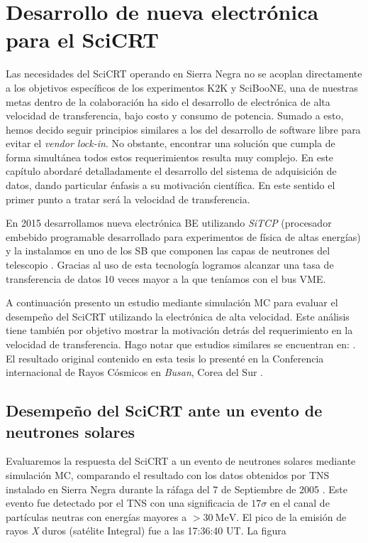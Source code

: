 
\chapter{Desarrollo de nueva electrónica para el SciCRT}
\label{chap:tres}

Las necesidades del SciCRT operando en Sierra Negra no se acoplan directamente a los objetivos específicos de los experimentos K2K y SciBooNE, una de nuestras metas dentro de la colaboración ha sido el desarrollo de electrónica de alta velocidad de transferencia, bajo costo y consumo de potencia. Sumado a esto, hemos decido seguir principios similares a los del desarrollo de software libre para evitar el \emph{vendor lock-in}. No obstante, encontrar una solución que cumpla de forma simultánea todos estos requerimientos resulta muy complejo. En este capítulo abordaré detalladamente el desarrollo del sistema de adquisición de datos, dando particular énfasis a su motivación científica. En este sentido el primer punto a tratar será la velocidad de transferencia.

En \num{2015} desarrollamos nueva electrónica BE utilizando \emph{SiTCP} (procesador embebido programable desarrollado para experimentos de física de altas energías) y la instalamos en uno de los SB que componen las capas de neutrones del telescopio \cite{ysasai17}. Gracias al uso de esta tecnología logramos alcanzar una tasa de transferencia de datos \num{10} veces mayor a la que teníamos con el bus VME.

A continuación presento un estudio mediante simulación MC para evaluar el desempeño del SciCRT utilizando la electrónica de alta velocidad. Este análisis tiene también por objetivo mostrar la motivación detrás del requerimiento en la velocidad de transferencia. Hago notar que estudios similares se encuentran en: \cite{ynagai14,ysasai17}. El resultado original contenido en esta tesis lo presenté en la Conferencia internacional de Rayos Cósmicos en \emph{Busan}, Corea del Sur \cite{manzorena171}.

\section{Desempeño del SciCRT ante un evento de neutrones solares}

Evaluaremos la respuesta del SciCRT a un evento de neutrones solares mediante simulación MC, comparando el resultado con los datos obtenidos por TNS instalado en Sierra Negra durante la ráfaga del \num{7} de Septiembre de \num{2005} \cite{sako06}. Este evento fue detectado por el TNS con una significacia de $17\sigma$ en el canal de partículas neutras con energías mayores a $>\SI{30}{\mega\electronvolt}$. El pico de la emisión de rayos \emph{X} duros (satélite Integral) fue a las 17:36:40 UT. La figura

